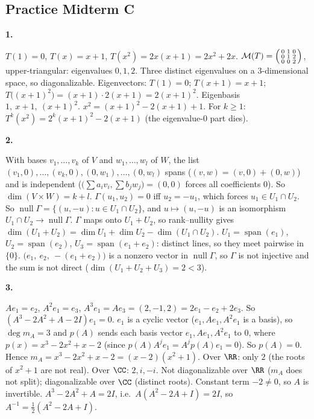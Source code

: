 \documentclass[10pt]{scrartcl}
\DeclareMathOperator{\nul}{null}
\DeclareMathOperator{\spn}{span}
\newcommand{\MM}{\mathcal M}
\begin{document}
\subsection*{Practice Midterm C}
\textbf{1.}
\begin{enumerate}[a)]
  \ii $T(1)=0$, $T(x)=x+1$, $T(x^2)=2x(x+1)=2x^2+2x$. $\MM(T)=\begin{psmallmatrix}0&1&0\\0&1&2\\0&0&2\end{psmallmatrix}$, upper-triangular: eigenvalues $0,1,2$.
  \ii Three distinct eigenvalues on a $3$-dimensional space, so diagonalizable. Eigenvectors: $T(1)=0$; $T(x+1)=x+1$; $T\big((x+1)^2\big)=(x+1)\cdot2(x+1)=2(x+1)^2$. Eigenbasis $1,\ x+1,\ (x+1)^2$.
  \ii $x^2=(x+1)^2-2(x+1)+1$. For $k\ge1$: $T^k(x^2)=2^k(x+1)^2-2(x+1)$ (the eigenvalue-$0$ part dies).
\end{enumerate}
\textbf{2.}
\begin{enumerate}[a)]
  \ii With bases $v_1,\dots,v_k$ of $V$ and $w_1,\dots,w_l$ of $W$, the list $(v_1,0),\dots,(v_k,0),(0,w_1),\dots,(0,w_l)$ spans ($(v,w)=(v,0)+(0,w)$) and is independent ($\big(\sum a_iv_i,\sum b_jw_j\big)=(0,0)$ forces all coefficients $0$). So $\dim(V\times W)=k+l$.
  \ii $\Gamma(u_1,u_2)=0$ iff $u_2=-u_1$, which forces $u_1\in U_1\cap U_2$. So $\nul\Gamma=\{(u,-u):u\in U_1\cap U_2\}$, and $u\mapsto(u,-u)$ is an isomorphism $U_1\cap U_2\to\nul\Gamma$. $\Gamma$ maps onto $U_1+U_2$, so rank--nullity gives $\dim(U_1+U_2)=\dim U_1+\dim U_2-\dim(U_1\cap U_2)$.
  \ii $U_1=\spn(e_1)$, $U_2=\spn(e_2)$, $U_3=\spn(e_1+e_2)$: distinct lines, so they meet pairwise in $\{0\}$. $\big(e_1,\ e_2,\ -(e_1+e_2)\big)$ is a nonzero vector in $\nul\Gamma$, so $\Gamma$ is not injective and the sum is not direct ($\dim(U_1+U_2+U_3)=2<3$).
\end{enumerate}
\textbf{3.}
\begin{enumerate}[a)]
  \ii $Ae_1=e_2$, $A^2e_1=e_3$, $A^3e_1=Ae_3=(2,-1,2)=2e_1-e_2+2e_3$. So $(A^3-2A^2+A-2I)e_1=0$. $e_1$ is a cyclic vector ($e_1,Ae_1,A^2e_1$ is a basis), so $\deg m_A=3$ and $p(A)$ sends each basis vector $e_1,Ae_1,A^2e_1$ to $0$, where $p(x)=x^3-2x^2+x-2$ (since $p(A)A^je_1=A^jp(A)e_1=0$). So $p(A)=0$. Hence $m_A=x^3-2x^2+x-2=(x-2)(x^2+1)$.
  \ii Over $\RR$: only $2$ (the roots of $x^2+1$ are not real). Over $\CC$: $2,i,-i$. Not diagonalizable over $\RR$ ($m_A$ does not split); diagonalizable over $\CC$ (distinct roots).
  \ii Constant term $-2\ne0$, so $A$ is invertible. $A^3-2A^2+A=2I$, i.e.\ $A(A^2-2A+I)=2I$, so $A^{-1}=\tfrac12(A^2-2A+I)$.
\end{enumerate}
\end{document}
